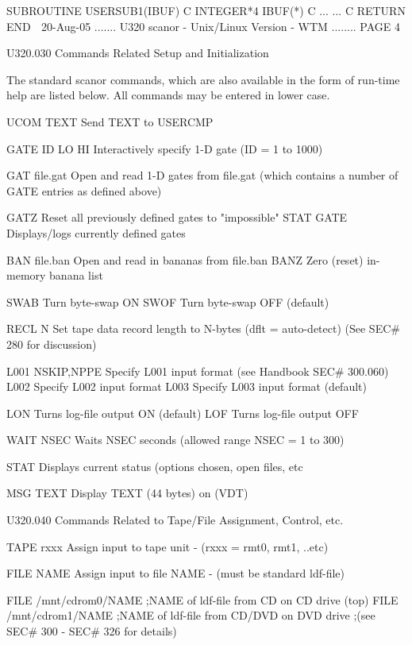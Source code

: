         SUBROUTINE USERSUB1(IBUF)
   C
        INTEGER*4 IBUF(*)
   C
        ...
        ...
   C
        RETURN
        END
    
   20-Aug-05 ....... U320  scanor - Unix/Linux Version - WTM ........ PAGE   4
 
 
   U320.030  Commands Related Setup and Initialization
 
   The  standard  scanor  commands,  which  are  also available in the form of
   run-time help are listed below. All commands may be entered in lower case.
 
   UCOM TEXT       Send TEXT to USERCMP
 
   GATE ID LO HI   Interactively specify 1-D gate (ID = 1 to 1000)
 
   GAT  file.gat   Open and read 1-D gates from file.gat (which contains a
                   number of GATE entries as defined above)
 
   GATZ            Reset all previously defined gates to "impossible"
   STAT GATE       Displays/logs currently defined gates
 
   BAN  file.ban   Open and read in bananas from file.ban
   BANZ            Zero (reset) in-memory banana list
 
   SWAB            Turn byte-swap ON
   SWOF            Turn byte-swap OFF (default)
 
   RECL N          Set tape data record length to N-bytes (dflt = auto-detect)
                   (See SEC# 280 for discussion)
 
   L001 NSKIP,NPPE Specify L001 input format (see Handbook SEC# 300.060)
   L002            Specify L002 input format
   L003            Specify L003 input format (default)
 
   LON             Turns log-file output ON (default)
   LOF             Turns log-file output OFF
 
   WAIT NSEC       Waits NSEC seconds (allowed range NSEC = 1 to 300)
 
   STAT            Displays current status (options chosen, open files, etc
 
   MSG  TEXT       Display TEXT (44 bytes) on (VDT)
 
   U320.040  Commands Related to Tape/File Assignment, Control, etc.
 
   TAPE rxxx  Assign input to tape unit   - (rxxx = rmt0, rmt1, ..etc)
 
   FILE NAME  Assign input to file NAME   - (must be standard ldf-file)
 
   FILE /mnt/cdrom0/NAME ;NAME of ldf-file from CD     on CD  drive (top)
   FILE /mnt/cdrom1/NAME ;NAME of ldf-file from CD/DVD on DVD drive
                         ;(see SEC# 300 - SEC# 326 for details)
 
